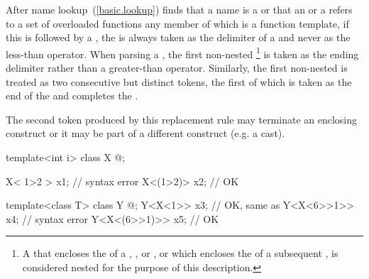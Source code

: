 \pnum
{}%
After name lookup~(\ref{basic.lookup}) finds that a name is a
or that an  or a  refers to a set of
overloaded functions any member of which is a function template,
if this is followed by a
\tcode{<},
the
\tcode{<}
is always taken as the delimiter of a
and never as the less-than operator.
When parsing a ,
the first non-nested
\tcode{>}\footnote{A \tcode{>} that encloses the 
of a , , 
or , or which encloses the 
of a subsequent , is considered nested for the purpose
of this description.
}
is taken as the ending delimiter
rather than a greater-than operator.
Similarly, the first non-nested \tcode{>{>}} is treated as two
consecutive but distinct \tcode{>} tokens, the first of which is taken
as the end of the  and completes
the . \begin{note} The second \tcode{>}
token produced by this replacement rule may terminate an enclosing
 construct or it may be part of a different
construct (e.g. a cast).\end{note}
\begin{example}

\begin{codeblock}
template<int i> class X { @\commentellip@ };

X< 1>2 > x1;                        // syntax error
X<(1>2)> x2;                        // OK

template<class T> class Y { @\commentellip@ };
Y<X<1>> x3;                         // OK, same as 
Y<X<6>>1>> x4;                      // syntax error
Y<X<(6>>1)>> x5;                    // OK
\end{codeblock}
\end{example}

